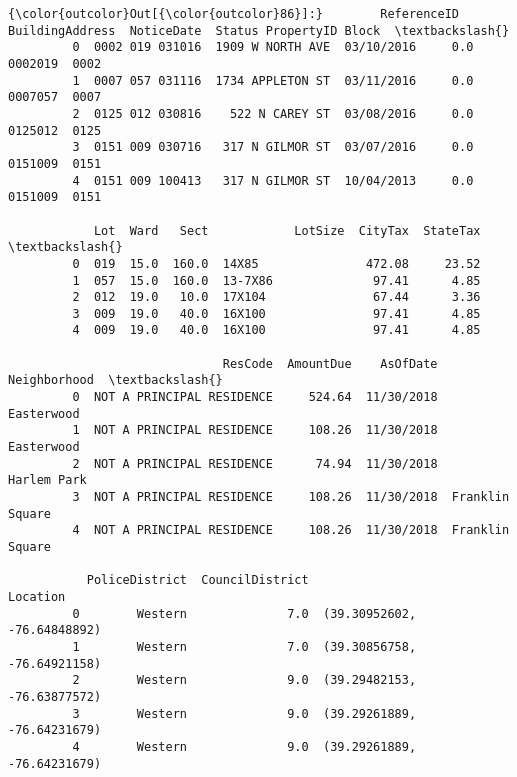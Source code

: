 \documentclass[11pt]{article}
\begin{document}
\begin{Verbatim}[commandchars=\\\{\}]
{\color{outcolor}Out[{\color{outcolor}86}]:}        ReferenceID   BuildingAddress  NoticeDate  Status PropertyID Block  \textbackslash{}
         0  0002 019 031016  1909 W NORTH AVE  03/10/2016     0.0    0002019  0002   
         1  0007 057 031116  1734 APPLETON ST  03/11/2016     0.0    0007057  0007   
         2  0125 012 030816    522 N CAREY ST  03/08/2016     0.0    0125012  0125   
         3  0151 009 030716   317 N GILMOR ST  03/07/2016     0.0    0151009  0151   
         4  0151 009 100413   317 N GILMOR ST  10/04/2013     0.0    0151009  0151   
         
            Lot  Ward   Sect            LotSize  CityTax  StateTax  \textbackslash{}
         0  019  15.0  160.0  14X85               472.08     23.52   
         1  057  15.0  160.0  13-7X86              97.41      4.85   
         2  012  19.0   10.0  17X104               67.44      3.36   
         3  009  19.0   40.0  16X100               97.41      4.85   
         4  009  19.0   40.0  16X100               97.41      4.85   
         
                              ResCode  AmountDue    AsOfDate     Neighborhood  \textbackslash{}
         0  NOT A PRINCIPAL RESIDENCE     524.64  11/30/2018       Easterwood   
         1  NOT A PRINCIPAL RESIDENCE     108.26  11/30/2018       Easterwood   
         2  NOT A PRINCIPAL RESIDENCE      74.94  11/30/2018      Harlem Park   
         3  NOT A PRINCIPAL RESIDENCE     108.26  11/30/2018  Franklin Square   
         4  NOT A PRINCIPAL RESIDENCE     108.26  11/30/2018  Franklin Square   
         
           PoliceDistrict  CouncilDistrict                     Location  
         0        Western              7.0  (39.30952602, -76.64848892)  
         1        Western              7.0  (39.30856758, -76.64921158)  
         2        Western              9.0  (39.29482153, -76.63877572)  
         3        Western              9.0  (39.29261889, -76.64231679)  
         4        Western              9.0  (39.29261889, -76.64231679)  
\end{Verbatim}
            
\end{document}
